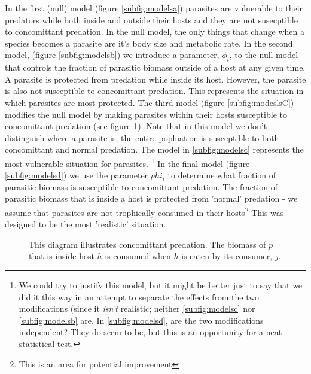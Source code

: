 \documentclass[11pt]{amsart}
\begin{document}
In the first (null) model (figure \ref{subfig:modelsa}) parasites are vulnerable to their predators while both inside and outside their hosts and they are not susecptible to concomittant predation.  In the null model, the only things that change when a species becomes a parasite are it's body size and metabolic rate.  In the second model, (figure \ref{subfig:modelsb})  we introduce a parameter, $\phi_i$, to the null model that controls the fraction of parasitic biomass outside of a host at any given time.  A parasite is protected from predation while inside its host.  However, the parasite is also not susceptible to concomittant predation.  This represents the situation in which parasites are most protected.  The third model (figure \ref{subfig:modeslsC}) modifies the null model by making parasites within their hosts susceptible to concomittant predation (see figure \ref{fig:concDiagram}).  Note that in this model we don't distinguish where a parasite is; the entire popluation is susceptible to both concomittant and normal predation.  The model in \ref{subfig:modelsc} represents the most vulnerable situation for parasites. \footnote{We could try to justify this model, but it might be better just to say that we did it this way in an attempt to separate the effects from the two modifications (since it \textit{isn't} realistic; neither \ref{subfig:modelsc} nor \ref{subfig:modelsb} are. In \ref{subfig:modelsd}, are the two modifications independent?  They do seem to be, but this is an opportunity for a neat statistical test.}  In the final model (figure \ref{subfig:modelsd}) we use the parameter $phi_i$ to determine what fraction of parasitic biomass is susceptible to concomittant predation.  The fraction of parasitic biomass that is inside a host is protected from 'normal' predation - we assume that parasites are not trophically consumed in their hosts\footnote{This is an area for potential improvement}  This was designed to be the most 'realistic' situation.

\begin{figure}
\caption{This diagram illustrates concomittant predation.  The biomass of $p$ that is inside host $h$ is consumed when $h$ is eaten by its consumer, $j$. \label{fig:concDiagram}}
\end{figure}
\end{document}
